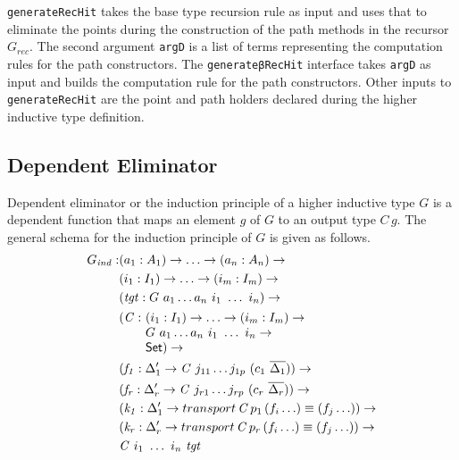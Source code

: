 \documentclass[sigplan,10pt]{acmart}
\begin{document}
{\tt generateRecHit} takes the base type recursion rule as input and uses that to eliminate the points during the construction of the path methods in the recursor $G_{rec}$. The second argument {\tt argD} is a list of terms representing the computation rules for the path constructors. The {\tt generateβRecHit} interface takes {\tt argD} as input and builds the computation rule for the path constructors. Other inputs to {\tt generateRecHit} are the point and path holders declared during the higher inductive type definition.

\subsection{Dependent Eliminator}
\label{sec:sec4.3}

Dependent eliminator or the induction principle of a higher inductive type $G$ is a dependent function that maps an element $g$ of $G$ to an output type $C \, g$. The general schema for the induction principle of $G$ is given as follows.
\begin{align*}
G_{\mathit{ind}} : & (a_1 : A_1) \to \ldots \to (a_n : A_n) \to\\
& (i_1 : I_1) \to \ldots \to (i_m : I_m) \to\\
& (\mathit{tgt} : G\ a_1 \ldots a_n\ i_1\ \ldots\ i_n) \to\\
& \begin{array}{@{}l@{}l}(\mathit{C} :\ & (i_1 : I_1) \to \ldots \to (i_m : I_m) \to\\  & G\ a_1 \ldots a_n\ i_1\ \ldots\ i_n \to\\ &\SET{})\to\end{array} \\
& (\mathit{f_1} : \Delta_1^\prime \to \mathit{C}\ j_{11} \ldots j_{1p}\ (c_1\ \overline{\Delta_1})) \to \\
& (\mathit{f_r} : \Delta_r^\prime \to \mathit{C}\ j_{r1} \ldots j_{rp}\ (c_r\ \overline{\Delta_r})) \to \\
& (\mathit{k_1} : \Delta_1^\prime \to transport \, \mathit{C} \, p_1 \, (f_i \ldots) \equiv (f_j \ldots)) \to \\
& (\mathit{k_r} : \Delta_r^\prime \to transport \, \mathit{C} \, p_r \, (f_i \ldots) \equiv (f_j \ldots)) \to \\
& \mathit{C}\ i_1\ \ldots\ i_n\ \mathit{tgt}
\end{align*}
\end{document}
